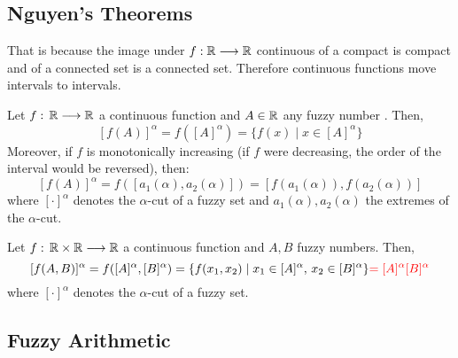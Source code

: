 \subsection{Nguyen's Theorems}

That is because the image under $f:\mathbb{R} \longrightarrow \mathbb{R}$ continuous of a compact is compact and of a connected set is a connected set. Therefore continuous functions move intervals to intervals.

\begin{theorem}
    Let $f:\, \mathbb{R} \longrightarrow \mathbb{R}$ a continuous function and $A\in \mathbb{R}$ any fuzzy number . Then,
    \[
    [f(A)]^{\alpha} = f([A]^{\alpha})=\{f(x)\mid x\in [A]^\alpha\}
    \]
    Moreover, if $f$ is monotonically increasing (if $f$ were decreasing, the order of the interval would be reversed), then:
    \[
    [f(A)]^{\alpha} = f([a_1(\alpha), a_2(\alpha)])=
    [f(a_1(\alpha)), f(a_2(\alpha))]
    \]
    where $[\cdot]^\alpha$ denotes the $\alpha$-cut of a fuzzy set and $a_1(\alpha), a_2(\alpha)$ the extremes of the $\alpha$-cut.
\end{theorem}


\begin{theorem}
    Let $f:\, \mathbb{R} \times \mathbb{R}\longrightarrow \mathbb{R}$ a continuous function and $A,B$  fuzzy numbers. Then,
    \[
    [f(A,B)]^{\alpha} = f([A]^{\alpha},[B]^{\alpha})=\{f(x_1,x_2)\mid x_1\in [A]^\alpha, \, x_2\in [B]^\alpha\}
    {\color{red}=[A]^\alpha [B]^\alpha}
    \]
    where $[\cdot]^\alpha$ denotes the $\alpha$-cut of a fuzzy set.
\end{theorem}





\subsection{Fuzzy Arithmetic}



